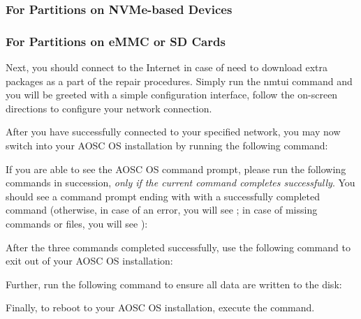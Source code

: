     \subsubsection*{For Partitions on NVMe-based Devices}


    \subsubsection*{For Partitions on eMMC or SD Cards}



    Next, you should connect to the Internet in case of need to download extra packages as a part of the repair procedures. Simply run the nmtui command and you will be greeted with a simple configuration interface, follow the on-screen directions to configure your network connection.

    After you have successfully connected to your specified network, you may now switch into your AOSC OS installation by running the following command:



    If you are able to see the AOSC OS command prompt,
    please run the following commands in succession,
    \textit{only if the current command completes successfully}.
    You should see a command prompt ending with \icode{\#} with a successfully completed command (otherwise,
    in case of an error, you will see \icode{!}; in case of missing commands or files, you will see ):


    After the three commands completed successfully, use the following command to exit out of your AOSC OS installation:


    Further, run the following command to ensure all data are written to the disk:


    Finally, to reboot to your AOSC OS installation, execute the  command.






